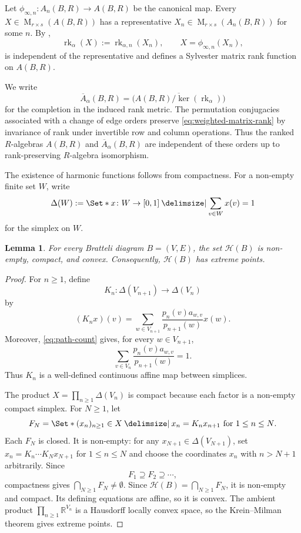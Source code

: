 \documentclass[11pt]{amsart}
\providecommand\given{}
\newcommand\SetSymbol[1][]{%
  \nonscript\:#1\vert\allowbreak\nonscript\:\mathopen{}%
}
\renewcommand\given{\SetSymbol[\delimsize]}#1%
\DeclareMathOperator{\rk}{rk}
\DeclareMathOperator{\Mat}{M}
\newtheorem{lemma}[theorem]{Lemma}
\theoremstyle{definition}
\theoremstyle{remark}
\begin{document}
Let $\phi_{\infty,n}\colon A_n(B,R)\to A(B,R)$ be the canonical map.
Every $X\in\Mat_{r\times s}(A(B,R))$ has a representative
$X_n\in\Mat_{r\times s}(A_n(B,R))$ for some \(n\).
By ,
\[
 \rk_\alpha(X):=\rk_{\alpha,n}(X_n),
 \qquad X=\phi_{\infty,n}(X_n),
\]
is independent of the representative and defines a Sylvester matrix
rank function on $A(B,R)$.

We write
\[
 \overline A_\alpha(B,R)
 =\overline{\bigl(A(B,R)/\ker(\rk_\alpha)\bigr)}
\]
for the completion in the induced rank metric.
The permutation conjugacies associated with a change of edge orders
preserve \eqref{eq:weighted-matrix-rank} by invariance of rank under
invertible row and column operations.  Thus the ranked $R$-algebras
$A(B,R)$ and $\overline A_\alpha(B,R)$ are independent of these
orders up to rank-preserving $R$-algebra isomorphism.

The existence of harmonic functions follows from compactness.
For a non-empty finite set $W$, write
\[
 \Delta(W)
 :=\Set*{x\colon W\to[0,1] \given \sum_{v\in W}x(v)=1}
\]
for the simplex on $W$.

\begin{lemma}\label{lem:harmonic-simplex-nonempty}
For every Bratteli diagram $B=(V,E)$, the set $\mathcal H(B)$ is non-empty, compact,
and convex.
Consequently, $\mathcal H(B)$ has extreme points.
\end{lemma}

\begin{proof}
For $n\geq1$, define
\[
 K_n\colon\Delta(V_{n+1})\longrightarrow\Delta(V_n)
\]
by
\[
 (K_nx)(v)
 =\sum_{w\in V_{n+1}}
   \frac{p_n(v)a_{w,v}}{p_{n+1}(w)}x(w).
\]
Moreover, \eqref{eq:path-count} gives, for every $w\in V_{n+1}$,
\[
 \sum_{v\in V_n}
 \frac{p_n(v)a_{w,v}}{p_{n+1}(w)}=1.
\]
Thus $K_n$ is a well-defined continuous affine map between simplices.

The product $X=\prod_{n\geq1}\Delta(V_n)$ is compact because each factor is a
non-empty compact simplex.
For $N\geq1$, let
\[
 F_N=
 \Set*{(x_n)_{n\geq1}\in X \given
 x_n=K_nx_{n+1}\text{ for }1\leq n\leq N}.
\]
Each $F_N$ is closed.  It is non-empty: for any
$x_{N+1}\in\Delta(V_{N+1})$, set
$x_n=K_n\cdots K_Nx_{N+1}$ for $1\leq n\leq N$ and choose the
coordinates $x_n$ with $n>N+1$ arbitrarily.
Since
\[
 F_1\supseteq F_2\supseteq\cdots,
\]
compactness gives \(\bigcap_{N\geq1}F_N\neq\emptyset\).
Since $\mathcal H(B)=\bigcap_{N\geq1}F_N$, it is non-empty and compact.
Its defining equations are affine, so it is convex.
The ambient product $\prod_{n\geq1}\mathbb R^{V_n}$ is a Hausdorff
locally convex space, so the Krein--Milman theorem gives extreme points.
\end{proof}
\end{document}
